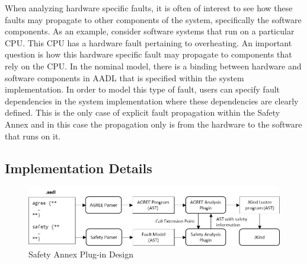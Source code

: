 When analyzing hardware specific faults, it is often of interest to see how these faults may propagate to other components of the system, specifically the software components. As an example, consider software systems that run on a particular CPU. This CPU has a hardware fault pertaining to overheating. An important question is how this hardware specific fault may propagate to components that rely on the CPU. In the nominal model, there is a binding between hardware and software components in AADL that is specified within the system implementation. In order to model this type of fault, users can specify fault dependencies in the system implementation where these dependencies are clearly defined. This is the only case of explicit fault propagation within the Safety Annex and in this case the propagation only is from the hardware to the software that runs on it. %


\subsection{Implementation Details}

\begin{figure}[h!]
\begin{center}
\includegraphics[width=.9\textwidth]{images/arch.png}
\vspace{0.1in}
\caption{Safety Annex Plug-in Design}
\label{fig:plugin-arch}
\end{center}
\end{figure}


